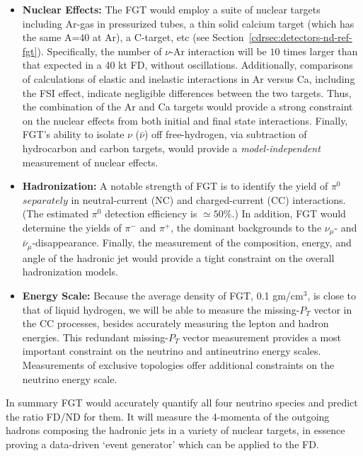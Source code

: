 \begin{itemize}
    \item {\bf  Nuclear Effects:} The FGT would employ a suite of nuclear targets including Ar-gas in pressurized tubes, 
    a thin solid calcium target (which has the same A=40 at Ar), a C-target, etc (see Section~\ref{cdrsec:detectors-nd-ref-fgt}). 
    Specifically, the number of $\nu$-Ar interaction will be $ 10$ times larger than that expected in a 40 kt FD, without 
    oscillations. Additionally, comparisons of calculations of elastic and  inelastic  interactions in  Ar versus Ca, 
    including the FSI effect, indicate negligible differences between the two targets. Thus, the combination of the 
    Ar and Ca targets would provide a strong constraint on the nuclear effects from both initial and final state interactions. 
    Finally, FGT's ability to isolate $\nu$ ($\bar\nu$) off free-hydrogen, via subtraction of hydrocarbon and carbon targets, 
    would provide a {\em model-independent} measurement of nuclear effects. 

    \item {\bf  Hadronization:} A notable strength of FGT is to identify the yield of $\pi^0$ $separately$ in neutral-current 
    (NC) and charged-current (CC) interactions. (The estimated $\pi^0$ detection efficiency is $\simeq 50\%$.) In addition, 
    FGT would determine the yields of $\pi^-$ and $\pi^+$, the dominant backgrounds to the $\nu_\mu$- and 
    $\bar\nu_\mu$-disappearance. Finally, the measurement of the composition, energy, and angle of the hadronic jet 
    would provide a tight constraint on the overall hadronization models. 

    \item {\bf Energy Scale:}  Because the average density of FGT, 0.1 gm/cm$^3$, is close to that of liquid hydrogen,  
    we will be able to measure the missing-$P_T$ vector in the CC processes, besides accurately measuring the lepton 
    and hadron energies. This redundant missing-$P_T$ vector measurement provides  a most important constraint 
    on the neutrino and antineutrino energy scales. Measurements of exclusive topologies offer additional constraints 
    on the neutrino energy scale. 
                 
\end{itemize}

In summary FGT would accurately quantify all four neutrino species and predict the ratio FD/ND for them. 
It will measure the 4-momenta of the outgoing hadrons composing the hadronic jets in a variety of 
nuclear targets, in essence proving a data-driven `event generator' which can be applied to the FD. 

